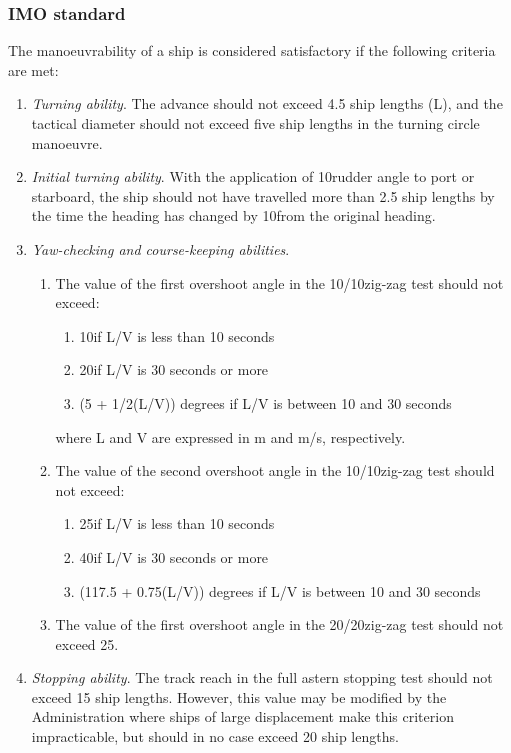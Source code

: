 \subsubsection{IMO standard}
The manoeuvrability of a ship is considered satisfactory if the following criteria are met:
\begin{enumerate}
	\item \emph{Turning ability}. The advance should not exceed 4.5 ship lengths (L), and the tactical diameter should not exceed five ship lengths in the turning circle manoeuvre.
	\item \emph{Initial turning ability}. With the application of 10\degree rudder angle to port or starboard, the ship should not have travelled more than 2.5 ship lengths by the time the heading has changed by 10\degree from the original heading. 
	\item \emph{Yaw-checking and course-keeping abilities}. 
	\begin{enumerate}
		\item The value of the first overshoot angle in the 10\degree/10\degree zig-zag test should not exceed: 
		\begin{enumerate}
			\item 10\degree if L/V is less than 10 seconds
			\item 20\degree if L/V is 30 seconds or more
			\item (5 + 1/2(L/V)) degrees if L/V is between 10 and 30 seconds
		\end{enumerate}
		where L and V are expressed in m and m/s, respectively.
		\item The value of the second overshoot angle in the 10\degree/10\degree zig-zag test should not exceed:
		\begin{enumerate}
			\item 25\degree if L/V is less than 10 seconds
			\item 40\degree if L/V is 30 seconds or more
			\item (117.5 + 0.75(L/V)) degrees if L/V is between 10 and 30 seconds
		\end{enumerate}
		\item The value of the first overshoot angle in the 20\degree/20\degree zig-zag test should not exceed 25\degree. 
	\end{enumerate}
	\item \emph{Stopping ability}. The track reach in the full astern stopping test should not exceed 15 ship lengths. However, this value may be modified by the Administration where ships of large displacement make this criterion impracticable, but should in no case exceed    20 ship lengths. 
\end{enumerate}


